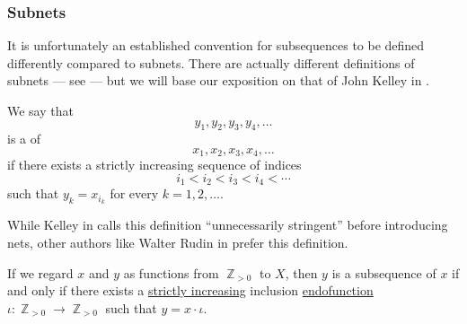 \subsubsection{Subnets}

It is unfortunately an established convention for subsequences to be defined differently compared to subnets. There are actually different definitions of subnets --- see \cite{Lehuta2009} --- but we will base our exposition on that of John Kelley in \cite[ch. 2]{Kelley1975}.

\begin{definition}\label{def:subsequence}
  We say that
  \begin{equation}\label{eq:def:subsequence/sub}
    y_1, y_2, y_3, y_4, \ldots
  \end{equation}
  is a  of
  \begin{equation}\label{eq:def:subsequence/original}
    x_1, x_2, x_3, x_4, \ldots
  \end{equation}
  if there exists a strictly increasing sequence of indices
  \begin{equation*}
    i_1 < i_2 < i_3 < i_4 < \cdots
  \end{equation*}
  such that \( y_k = x_{i_k} \) for every \( k = 1, 2, \ldots \).
\end{definition}
\begin{comments}
  \item While Kelley in \cite[63]{Kelley1975} calls this definition \enquote{unnecessarily stringent} before introducing nets, other authors like Walter Rudin in \cite[def. 3.5]{Rudin1976Principles} prefer this definition.

  \item If we regard \( x \) and \( y \) as functions from \( \BbbZ_{>0} \) to \( X \), then \( y \) is a subsequence of \( x \) if and only if there exists a \hyperref[def:order_homomorphism/increasing]{strictly increasing} inclusion \hyperref[def:function/endofunction]{endofunction} \( \iota: \BbbZ_{>0} \to \BbbZ_{>0} \) such that \( y = x \cdot \iota \).
\end{comments}

